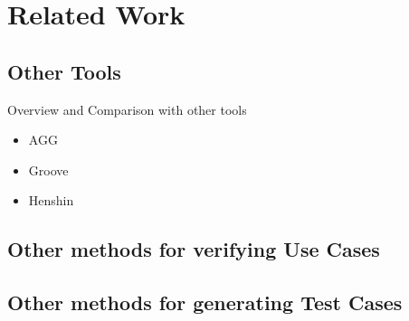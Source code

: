 \chapter{Related Work}\label{ch:related-work}

\section{Other Tools}

Overview and Comparison with other tools

\begin{itemize}
\item AGG
\item Groove
\item Henshin
\end{itemize}

\section{Other methods for verifying Use Cases}

\section{Other methods for generating Test Cases}
